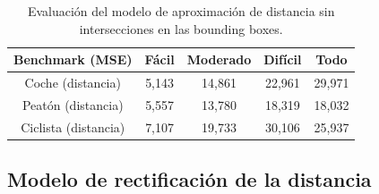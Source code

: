 \begin{table}[H]
\centering
\begin{tabular}{|c|c|c|c|c|}
\hline
\textbf{Benchmark (MSE)} & \textbf{Fácil} & \textbf{Moderado} & \textbf{Difícil} & \textbf{Todo}\\ \hline \hline
Coche (distancia)        & 5,143          & 14,861             & 22,961       &29,971     \\ \hline
Peatón (distancia)       & 5,557          & 13,780             & 18,319       &18,032     \\ \hline
Ciclista (distancia)     & 7,107          & 19,733             & 30,106       &25,937  \\ \hline
\end{tabular}
\caption{Evaluación del modelo de aproximación de distancia sin intersecciones en las bounding boxes.}
\label{fig:Evaluación sobre KITTI del primer modelo de aproximación de distancia basado en nube de puntos.}
\end{table}

\subsection{Modelo de rectificación de la distancia}
\label{sec:Modelo de rectificación de la distancia}

